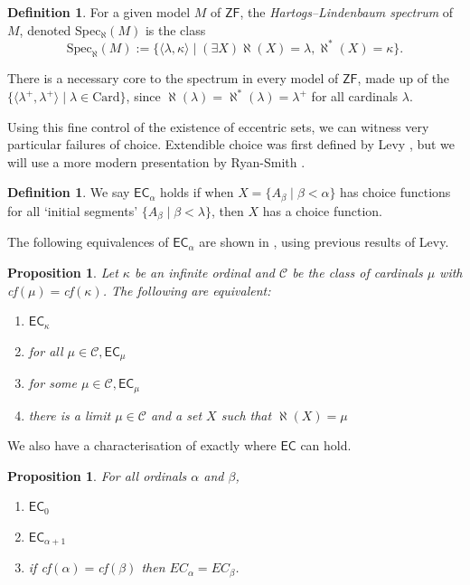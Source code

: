 \documentclass[a4paper,11pt]{amsart}
\newtheorem{prop}[theorem]{Proposition}
\theoremstyle{definition}
\newtheorem{definition}[theorem]{Definition}
\newcommand{\ZF}{\mathsf{ZF}}
\newcommand{\EC}{\mathsf{EC}}
\begin{document}
\begin{definition}
    For a given model $M$ of $\ZF$, the \emph{Hartogs--Lindenbaum spectrum} of $M$, denoted Spec$_\aleph (M)$ is the class \[\text{Spec}_\aleph (M) := \{ \langle \lambda, \kappa \rangle \mid (\exists X) \aleph(X) = \lambda, \aleph^*(X) = \kappa \}.\]
\end{definition}

There is a necessary core to the spectrum in every model of $\ZF$, made up of the $\{\langle \lambda^+, \lambda^+ \rangle \mid \lambda \in \text{Card} \}$, since $\aleph(\lambda) = \aleph^*(\lambda) = \lambda^+$ for all cardinals $\lambda$. 


Using this fine control of the existence of eccentric sets, we can witness very particular failures of choice. Extendible choice was first defined by Levy \cite{Levy}, but we will use a more modern presentation by Ryan-Smith \cite{RS25eccentricity}. 

\begin{definition}\label{EC}
    We say $\EC_\alpha$ holds if when $X = \{A_\beta \mid \beta < \alpha \}$ has choice functions for all `initial segments' $\{A_\beta \mid \beta < \lambda \}$, then $X$ has a choice function.
\end{definition}

The following equivalences of $\EC_\alpha$ are shown in \cite{RS25eccentricity}, using previous results of Levy.

\begin{prop}
    Let $\kappa$ be an infinite ordinal and $\mathcal{C}$ be the class of cardinals $\mu$ with cf$(\mu) =$cf$(\kappa)$. The following are equivalent: 
    \begin{enumerate}
        \item $\EC_\kappa$
        \item for all $\mu \in \mathcal{C}, \EC_\mu$
        \item for some $\mu \in \mathcal{C}, \EC_\mu$
        \item there is a limit $\mu \in \mathcal{C}$ and a set $X$ such that $\aleph(X) = \mu$
    \end{enumerate}
\end{prop}

We also have a characterisation of exactly where $\EC$ can hold. 

\begin{prop}\label{ec-at-sucessors}
    For all ordinals $\alpha$ and $\beta$, 
    \begin{enumerate}
        \item $\EC_0$
        \item $\EC_{\alpha + 1}$
        \item if cf$(\alpha) =$cf$(\beta)$ then $EC_\alpha = EC_\beta$. 
    \end{enumerate}
\end{prop}
\end{document}
